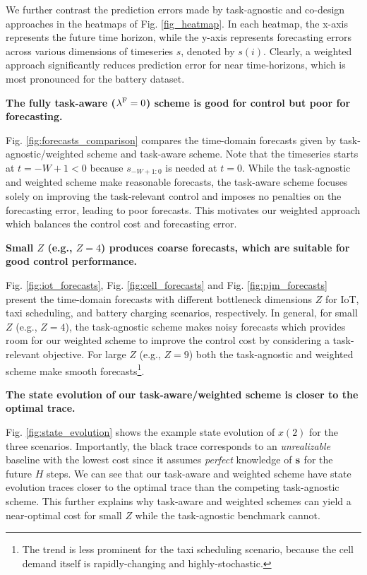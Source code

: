 We further contrast the prediction errors made by task-agnostic and co-design approaches in the heatmaps of Fig. \ref{fig_heatmap}. In each heatmap, the x-axis represents the future time horizon, while the y-axis represents forecasting errors across various dimensions of timeseries $s$, denoted by $s(i)$.  Clearly, a weighted approach significantly reduces prediction error for near time-horizons, which is most pronounced for the battery dataset.




\textbf{The fully task-aware ($\lambda^{\mathrm{F}} = 0$) scheme is good for control but poor for forecasting.} 

Fig. \ref{fig:forecasts_comparison} compares the time-domain forecasts given by task-agnostic/weighted scheme and task-aware scheme. Note that the timeseries starts at $t=-W+1<0$ because $s_{-W+1:0}$ is needed at $t=0$. While the task-agnostic and weighted scheme make reasonable forecasts, the task-aware scheme focuses solely on improving the task-relevant control and imposes no penalties on the forecasting error, leading to poor forecasts. This motivates our weighted approach which balances the control cost and forecasting error.

\textbf{Small $Z$ (e.g., $Z=4$) produces coarse forecasts, which are suitable for good control performance.} 

Fig. \ref{fig:iot_forecasts}, Fig. \ref{fig:cell_forecasts} and Fig. \ref{fig:pjm_forecasts} present the time-domain forecasts with different bottleneck dimensions $Z$ for IoT, taxi scheduling, and battery charging scenarios, respectively. In general, for small $Z$ (e.g., $Z=4$), the task-agnostic scheme makes noisy forecasts which provides room for our weighted scheme to improve the control cost by considering a task-relevant objective. For large $Z$ (e.g., $Z=9$) both the task-agnostic and weighted scheme make smooth forecasts\footnote{The trend is less prominent for the taxi scheduling scenario, because the cell demand itself is rapidly-changing and highly-stochastic.}.


\textbf{The state evolution of our task-aware/weighted scheme is closer to the optimal trace.} 

Fig. \ref{fig:state_evolution} shows the example state evolution of $x(2)$ for the three scenarios. Importantly, the black trace corresponds to an \textit{unrealizable} baseline with the lowest cost since it assumes \textit{perfect} knowledge of $\bold{s}$ for the future $H$ steps. We can see that our task-aware and weighted scheme have state evolution traces closer to the optimal trace than the competing task-agnostic scheme. This further explains why task-aware and weighted schemes can yield a near-optimal cost for small $Z$ while the task-agnostic benchmark cannot.
